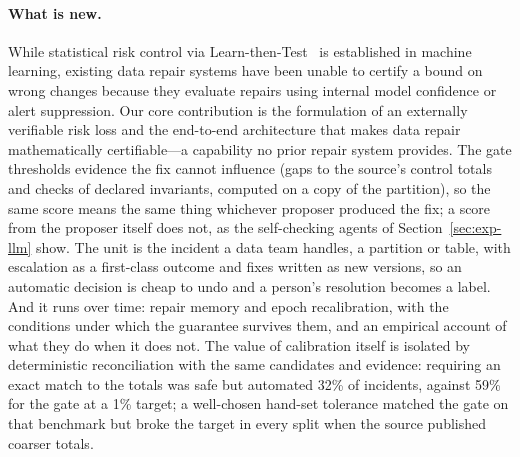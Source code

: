 \paragraph{What is new.} While statistical risk control via Learn-then-Test~\cite{angelopoulos2021ltt} is established in machine learning, existing data repair systems have been unable to certify a bound on wrong changes because they evaluate repairs using internal model confidence or alert suppression. Our core contribution is the formulation of an externally verifiable risk loss and the end-to-end architecture that makes data repair mathematically certifiable---a capability no prior repair system provides. The gate thresholds evidence the fix cannot influence (gaps to the source's control totals and checks of declared invariants, computed on a copy of the partition), so the same score means the same thing whichever proposer produced the fix; a score from the proposer itself does not, as the self-checking agents of Section~\ref{sec:exp-llm} show. The unit is the incident a data team handles, a partition or table, with escalation as a first-class outcome and fixes written as new versions, so an automatic decision is cheap to undo and a person's resolution becomes a label. And it runs over time: repair memory and epoch recalibration, with the conditions under which the guarantee survives them, and an empirical account of what they do when it does not. The value of calibration itself is isolated by deterministic reconciliation with the same candidates and evidence: requiring an exact match to the totals was safe but automated 32\% of incidents, against 59\% for the gate at a 1\% target; a well-chosen hand-set tolerance matched the gate on that benchmark but broke the target in every split when the source published coarser totals.

